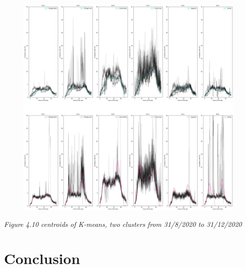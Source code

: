 \documentclass[11pt]{article}
\begin{document}
    \begin{figure}
    \centering
    \includegraphics{centroids K=2 softDTW 2020.png}
    \caption{}
    \label{Fig 4.10}
\end{figure}

\emph{\small Figure 4.10 centroids of K-means, two clusters from 31/8/2020 to 31/12/2020}

    \hypertarget{conclusion}{%
\section{Conclusion}\label{conclusion}}
\end{document}

